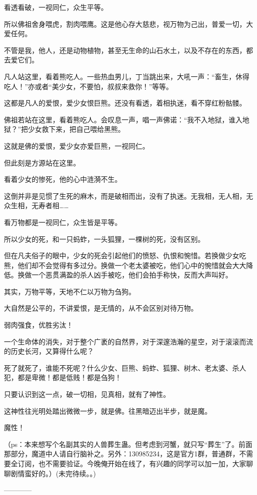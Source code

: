 \begin{this_body}
看透看破，一视同仁，众生平等。

所以佛祖舍身喂虎，割肉喂鹰。这是他心存大慈悲，视万物为己出，普爱一切，大爱任何。

不管是我，他人，还是动物植物，甚至无生命的山石水土，以及不存在的东西，都去爱它们。

凡人站这里，看着熊吃人。一些热血男儿，丁当跳出来，大吼一声：“畜生，休得吃人！”亦或者“美少女，不要怕，叔叔来救你！”等等。

这都是凡人的爱恨，爱少女恨巨熊。还没有看透，着相执迷，看不穿红粉骷髅。

佛祖若站在这里，看着熊吃人。会叹息一声，唱一声佛诺：“我不入地狱，谁入地狱？”把少女救下来，把自己喂给黑熊。

这就是佛的爱恨，爱少女亦爱巨熊，一视同仁。

但此刻是方源站在这里。

看着少女的惨死，他的心中涟漪不生。

这倒并非是见惯了生死的麻木，而是破相而出，没有了执迷。无我相，无人相，无众生相，无寿者相……

看万物都是一视同仁，众生皆是平等。

所以少女的死，和一只蚂蚱，一头狐狸，一棵树的死，没有区别。

但在凡夫俗子的眼中，少女的死会引起他们的愤怒、仇恨和惋惜。若换做少女吃熊，他们却不会觉得有多过分。换做一个老太婆被吃，他们心中的惋惜就会大大降低。换做一个恶贯满盈的杀人凶手被吃，他们会拍手称快，反而大声叫好。

其实，万物平等，天地不仁以万物为刍狗。

大自然是公平的，不讲爱恨，是无情的，从不会区别对待万物。

弱肉强食，优胜劣汰！

一个生命体的消失，对于整个广袤的自然界，对于深邃浩瀚的星空，对于滚滚而流的历史长河，又算得什么呢？

死了就死了，谁能不死呢？什么少女、巨熊、蚂蚱、狐狸、树木、老太婆、杀人犯，都是卑微！都是低贱！都是刍狗！

只要认识到这一点，破一切相，见真相，就有了神性。

这神性往光明处踏出微微一步，就是佛。往黑暗迈出半步，就是魔。

魔性！

（ps：本来想写个名副其实的人兽葬生蛊。但考虑到河蟹，就只写“葬生”了。前面那部分，魔道中人请自行脑补之。另外：130985234，这是官方1群，普通群，不需要全订阅，也不需要验证。今晚俺开始在线了，有兴趣的同学可以加一加，大家聊聊剧情蛮好的。）(未完待续。。)

------------

\end{this_body}

